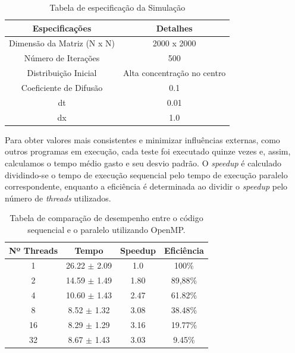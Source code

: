 \documentclass[12pt]{article}
\begin{document}
\begin{table}[ht]
\centering
\caption{Tabela de especificação da Simulação}
\vspace{0.3cm}
\begin{tabular}{||c c||} 
 \hline
Especificações & Detalhes \\ [0.5ex] 
 \hline\hline
 Dimensão da Matriz (N x N) & 2000 x 2000 \\ 
 \hline
 Número de Iterações & 500  \\
 \hline
 Distribuição Inicial & Alta concentração no centro  \\
 \hline
 Coeficiente de Difusão & 0.1   \\ 
 \hline
 dt & 0.01   \\ 
 \hline
 dx & 1.0   \\ 
 \hline
\end{tabular}
\end{table}

Para obter valores mais consistentes e minimizar influências externas, como outros programas em execução, cada teste foi executado quinze vezes e, assim, calculamos o tempo médio gasto e seu desvio padrão. O \textit{speedup} é calculado dividindo-se o tempo de execução sequencial pelo tempo de execução paralelo correspondente, enquanto a eficiência é determinada ao dividir o \textit{speedup} pelo número de \textit{threads} utilizados.

\begin{table}[ht]
\centering
\caption{Tabela de comparação de desempenho entre o código sequencial e o paralelo utilizando OpenMP.}
\vspace{0.3cm}
\begin{tabular}{||c c c c||} 
 \hline
 Nº Threads & Tempo & Speedup & Eficiência \\ [0.5ex] 
 \hline\hline
 1 & 26.22 $\pm$ 2.09 & 1.0 & 100\% \\ 
 \hline
 2 & 14.59 $\pm$ 1.49 & 1.80 & 89,88\% \\
 \hline
 4 & 10.60 $\pm$ 1.43 & 2.47 & 61.82\% \\
 \hline
 8 & 8.52 $\pm$ 1.32 & 3.08 & 38.48\% \\
 \hline
 16 & 8.29 $\pm$ 1.29 & 3.16 & 19.77\% \\
 \hline
 32 & 8.67 $\pm$ 1.43 & 3.03 & 9.45\% \\ 
 \hline
\end{tabular}
\end{table}
\end{document}
